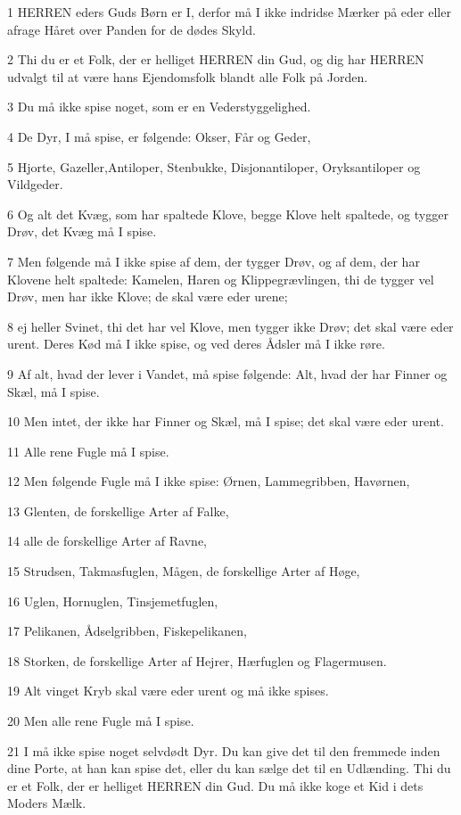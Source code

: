 \par 1 HERREN eders Guds Børn er I, derfor må I ikke indridse Mærker på eder eller afrage Håret over Panden for de dødes Skyld.
\par 2 Thi du er et Folk, der er helliget HERREN din Gud, og dig har HERREN udvalgt til at være hans Ejendomsfolk blandt alle Folk på Jorden.
\par 3 Du må ikke spise noget, som er en Vederstyggelighed.
\par 4 De Dyr, I må spise, er følgende: Okser, Får og Geder,
\par 5 Hjorte, Gazeller,Antiloper, Stenbukke, Disjonantiloper, Oryksantiloper og Vildgeder.
\par 6 Og alt det Kvæg, som har spaltede Klove, begge Klove helt spaltede, og tygger Drøv, det Kvæg må I spise.
\par 7 Men følgende må I ikke spise af dem, der tygger Drøv, og af dem, der har Klovene helt spaltede: Kamelen, Haren og Klippegrævlingen, thi de tygger vel Drøv, men har ikke Klove; de skal være eder urene;
\par 8 ej heller Svinet, thi det har vel Klove, men tygger ikke Drøv; det skal være eder urent. Deres Kød må I ikke spise, og ved deres Ådsler må I ikke røre.
\par 9 Af alt, hvad der lever i Vandet, må spise følgende: Alt, hvad der har Finner og Skæl, må I spise.
\par 10 Men intet, der ikke har Finner og Skæl, må I spise; det skal være eder urent.
\par 11 Alle rene Fugle må I spise.
\par 12 Men følgende Fugle må I ikke spise: Ørnen, Lammegribben, Havørnen,
\par 13 Glenten, de forskellige Arter af Falke,
\par 14 alle de forskellige Arter af Ravne,
\par 15 Strudsen, Takmasfuglen, Mågen, de forskellige Arter af Høge,
\par 16 Uglen, Hornuglen, Tinsjemetfuglen,
\par 17 Pelikanen, Ådselgribben, Fiskepelikanen,
\par 18 Storken, de forskellige Arter af Hejrer, Hærfuglen og Flagermusen.
\par 19 Alt vinget Kryb skal være eder urent og må ikke spises.
\par 20 Men alle rene Fugle må I spise.
\par 21 I må ikke spise noget selvdødt Dyr. Du kan give det til den fremmede inden dine Porte, at han kan spise det, eller du kan sælge det til en Udlænding. Thi du er et Folk, der er helliget HERREN din Gud. Du må ikke koge et Kid i dets Moders Mælk.
